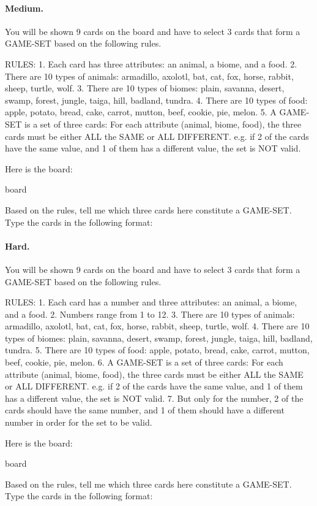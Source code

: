 \paragraph{Medium.}
\begin{promptbox}
You will be shown 9 cards on the board and have to select 3 cards that form a GAME-SET based on the following rules.

RULES:
1. Each card has three attributes: an animal, a biome, and a food.
2. There are 10 types of animals: armadillo, axolotl, bat, cat, fox, horse, rabbit, sheep, turtle, wolf.
3. There are 10 types of biomes: plain, savanna, desert, swamp, forest, jungle, taiga, hill, badland, tundra.
4. There are 10 types of food: apple, potato, bread, cake, carrot, mutton, beef, cookie, pie, melon.
5. A GAME-SET is a set of three cards: For each attribute (animal, biome, food), the three cards must be either ALL the SAME or ALL DIFFERENT. e.g. if 2 of the cards have the same value, and 1 of them has a different value, the set is NOT valid.

Here is the board:

{board}

Based on the rules, tell me which three cards here constitute a GAME-SET. Type the cards in the following format:
\end{promptbox}

\paragraph{Hard.}
\begin{promptbox}
You will be shown 9 cards on the board and have to select 3 cards that form a GAME-SET based on the following rules.

RULES:
1. Each card has a number and three attributes: an animal, a biome, and a food.
2. Numbers range from 1 to 12.
3. There are 10 types of animals: armadillo, axolotl, bat, cat, fox, horse, rabbit, sheep, turtle, wolf.
4. There are 10 types of biomes: plain, savanna, desert, swamp, forest, jungle, taiga, hill, badland, tundra.
5. There are 10 types of food: apple, potato, bread, cake, carrot, mutton, beef, cookie, pie, melon.
6. A GAME-SET is a set of three cards: For each attribute (animal, biome, food), the three cards must be either ALL the SAME or ALL DIFFERENT. e.g. if 2 of the cards have the same value, and 1 of them has a different value, the set is NOT valid.
7. But only for the number, 2 of the cards should have the same number, and 1 of them should have a different number in order for the set to be valid.

Here is the board:

{board}

Based on the rules, tell me which three cards here constitute a GAME-SET. Type the cards in the following format:
\end{promptbox}


